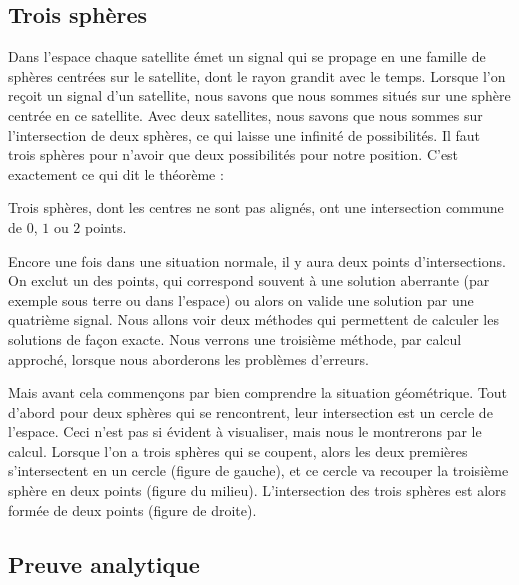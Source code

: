 \documentclass[class=report,crop=false]{standalone}
\begin{document}
\subsection{Trois sphères}

Dans l'espace chaque satellite émet un signal qui se propage en une famille de sphères
centrées sur le satellite, dont le rayon grandit avec le temps.
Lorsque l'on reçoit un signal d'un satellite, 
nous savons que nous sommes situés sur une sphère centrée en ce satellite.
Avec deux satellites, nous savons que nous sommes sur l'intersection de deux sphères,
ce qui laisse une infinité de possibilités. Il faut trois sphères pour
n'avoir que deux possibilités pour notre position.
C'est exactement ce qui dit le théorème :
\begin{theoreme}
Trois sphères, dont les centres ne sont pas alignés, 
ont une intersection commune de $0$, $1$ ou $2$ points.
\end{theoreme}

Encore une fois dans une situation normale, il y aura deux points d'intersections.
On exclut un des points, qui correspond souvent à une solution aberrante 
(par exemple sous terre ou dans l'espace) ou alors on valide une solution par une quatrième signal.
Nous allons voir deux méthodes qui permettent de calculer les solutions de façon exacte. 
Nous verrons une troisième méthode, par calcul approché,
lorsque nous aborderons les problèmes d'erreurs.

Mais avant cela commençons par bien comprendre la situation géométrique.
Tout d'abord pour deux sphères qui se rencontrent, 
leur intersection est un cercle de l'espace. Ceci n'est pas si évident à visualiser, 
mais nous le montrerons par le calcul. Lorsque l'on a trois
sphères qui se coupent, alors les deux premières s'intersectent en un cercle (figure de gauche), 
et ce cercle va recouper la troisième sphère en deux points (figure du milieu).
L'intersection des trois sphères est alors formée de deux points (figure de droite).




\subsection{Preuve analytique}
\end{document}
